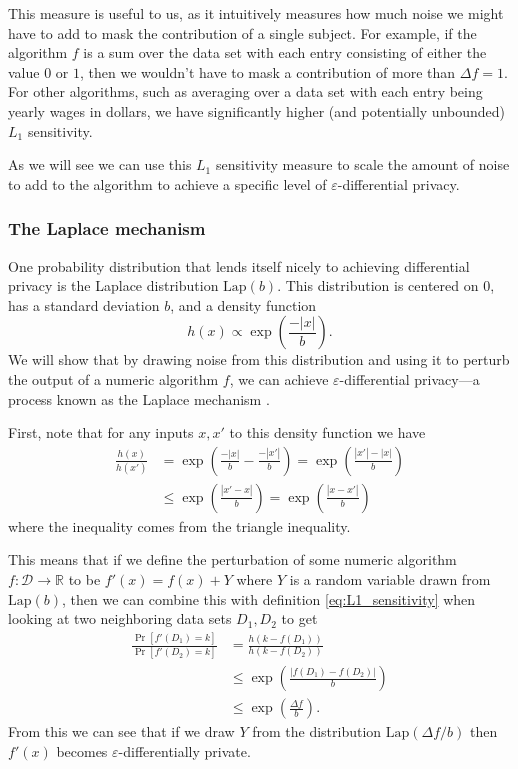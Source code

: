 \documentclass[a4paper,12pt]{article}
\newcommand{\fancy}{\mathcal}
\renewcommand{\epsilon}{\varepsilon}
\begin{document}
This measure is useful to us, as it intuitively measures how much noise we might have to add to mask the contribution of a single subject. For example, if the algorithm $f$ is a sum over the data set with each entry consisting of either the value $0$ or $1$, then we wouldn't have to mask a contribution of more than $\Delta f = 1$. For other algorithms, such as averaging over a data set with each entry being yearly wages in dollars, we have significantly higher (and potentially unbounded) $L_1$ sensitivity.

As we will see we can use this $L_1$ sensitivity measure to scale the amount of noise to add to the algorithm to achieve a specific level of $\epsilon$-differential privacy.

\subsubsection{The Laplace mechanism}

One probability distribution that lends itself nicely to achieving differential privacy is the Laplace distribution $\text{Lap}(b)$. This distribution is centered on 0, has a standard deviation $b$, and a density function
\begin{equation*}
    h(x)\propto \exp\left(\frac{-|x|}{b}\right).
\end{equation*}
We will show that by drawing noise from this distribution and using it to perturb the output of a numeric algorithm $f$, we can achieve $\epsilon$-differential privacy---a process known as the Laplace mechanism \cite{dworketal2006}.

First, note that for any inputs $x,x'$ to this density function we have
\begin{align*}
    \frac{h(x)}{h(x')} &= \exp\left(\frac{-|x|}{b}-\frac{-|x'|}{b}\right) = \exp\left(\frac{|x'|-|x|}{b} \right) \\
        &\leq \exp\left( \frac{|x'-x|}{b} \right) = \exp\left( \frac{|x-x'|}{b} \right)
\end{align*}
where the inequality comes from the triangle inequality.

This means that if we define the perturbation of some numeric algorithm $f: \fancy{D} \to \mathbb{R}$ to be $f'(x) = f(x)+Y$ where $Y$ is a random variable drawn from $\text{Lap}(b)$, then we can combine this with definition \ref{eq:L1_sensitivity} when looking at two neighboring data sets $D_1,D_2$ to get
\begin{align*}
    \frac{\Pr[f'(D_1)=k]}{\Pr[f'(D_2)=k]} &= \frac{h(k - f(D_1))}{h(k - f(D_2))} \\
        &\leq \exp\left( \frac{|f(D_1)-f(D_2)|}{b}\right) \\
        &\leq \exp\left(\frac{\Delta f}{b}\right).
\end{align*}
From this we can see that if we draw $Y$ from the distribution $\text{Lap}(\Delta f/b)$ then $f'(x)$ becomes $\epsilon$-differentially private.
\end{document}
